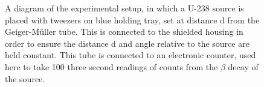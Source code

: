 \documentclass[11pt]{article}
\begin{document}
    \begin{figure}[ht]
        \begin{center}
            \def\svgwidth{\columnwidth}
            
             \caption{A diagram of the experimental setup, in which a U-238 source is placed with tweezers on blue holding tray, set at distance d from the Geiger-Müller tube. This is connected to the shielded housing in order to ensure the distance d and angle relative to the source are held constant. This tube is connected to an electronic counter, used here to take  100 three second readings of counts from the $\beta$ decay of the source.}
             \label{fig:experimental setup}
        \end{center}
    \end{figure}
\end{document}
